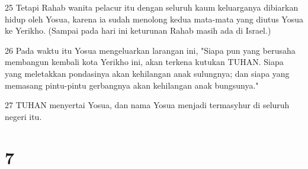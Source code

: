\par 25 Tetapi Rahab wanita pelacur itu dengan seluruh kaum keluarganya dibiarkan hidup oleh Yosua, karena ia sudah menolong kedua mata-mata yang diutus Yosua ke Yerikho. (Sampai pada hari ini keturunan Rahab masih ada di Israel.)
\par 26 Pada waktu itu Yosua mengeluarkan larangan ini, "Siapa pun yang berusaha membangun kembali kota Yerikho ini, akan terkena kutukan TUHAN. Siapa yang meletakkan pondasinya akan kehilangan anak sulungnya; dan siapa yang memasang pintu-pintu gerbangnya akan kehilangan anak bungsunya."
\par 27 TUHAN menyertai Yosua, dan nama Yosua menjadi termasyhur di seluruh negeri itu.

\chapter{7}

